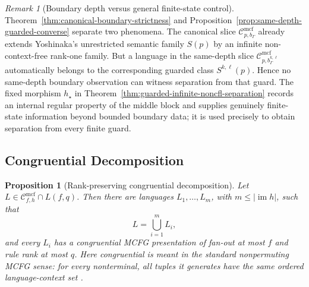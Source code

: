 \documentclass[11pt,a4paper]{article}
\numberwithin{equation}{section}
\theoremstyle{plain}
\newtheorem{proposition}[theorem]{Proposition}
\theoremstyle{definition}
\theoremstyle{remark}
\newtheorem{remark}[theorem]{Remark}
\newcommand{\Cmcf}[2]{\mathcal{C}^{\mathrm{mcf}}_{#1,#2}}
\begin{document}
\begin{remark}[Boundary depth versus general finite-state control]
Theorem~\ref{thm:canonical-boundary-strictness} and
Proposition~\ref{prop:same-depth-guarded-converse} separate two phenomena.
The canonical slice \(\Cmcf{p}{b_\Gamma}\) already extends Yoshinaka's
unrestricted semantic family \(S(p)\) by an infinite non-context-free
rank-one family.  But a language in the same-depth slice
\(\Cmcf{p}{b_\Gamma^{k,\ell}}\) automatically belongs to the corresponding
guarded class \(S^{k,\ell}(p)\).  Hence no same-depth boundary observation can
witness separation from that guard.  The fixed morphism \(h_\star\) in
Theorem~\ref{thm:guarded-infinite-noncfl-separation} records an internal
regular property of the middle block and supplies genuinely finite-state
information beyond bounded boundary data; it is used precisely to obtain
separation from every finite guard.
\end{remark}

\subsection{Congruential Decomposition}
\begin{proposition}[Rank-preserving congruential decomposition]
\label{prop:congruential-decomposition}
Let \(L\in\Cmcf{f}{h}\cap L(f,q)\).  Then there are languages
\(L_1,\ldots,L_m\), with
\(m\le |\operatorname{im}h|\), such that
\[
  L=\bigcup_{i=1}^m L_i,
\]
and every \(L_i\) has a congruential MCFG presentation of fan-out at most
\(f\) and rule rank at most \(q\).  Here congruential is meant in the standard
nonpermuting MCFG sense: for every nonterminal, all tuples it generates have
the same ordered language-context set
\cite{Yoshinaka2010,ClarkYoshinaka2016}.
\end{proposition}
\end{document}

